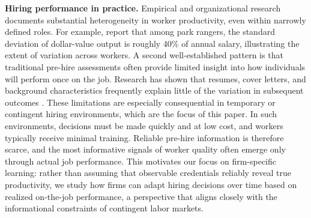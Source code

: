 \documentclass[opre,blindrev]{informs3}
\begin{document}
{\bf Hiring performance in practice.}
Empirical and organizational research documents substantial heterogeneity in worker productivity, even within narrowly defined roles. For example, \cite{schmidt1984selection} report that among park rangers, the standard deviation of dollar-value output is roughly 40\% of annual salary, illustrating the extent of variation across workers.
A second well-established pattern is that traditional pre-hire assessments often provide limited insight into how individuals will perform once on the job. 
Research has shown that %
resumes, cover letters, and background characteristics frequently explain little of the variation in subsequent outcomes \citep{gordon2006identifying, sackett2022revisiting, risavy2022resumes, murphy2009predictive}. 
These limitations are especially consequential in temporary or contingent hiring environments, which are the focus of this paper. In such environments, decisions must be made quickly and at low cost, and workers typically receive minimal training. Reliable pre-hire information is therefore scarce, and the most informative signals of worker quality often emerge only through actual job performance. This motivates our focus on firm-specific learning: rather than assuming that observable credentials reliably reveal true productivity, we study how firms can adapt hiring decisions over time based on realized on-the-job performance, a perspective that aligns closely with the informational constraints of contingent labor markets.
\end{document}
